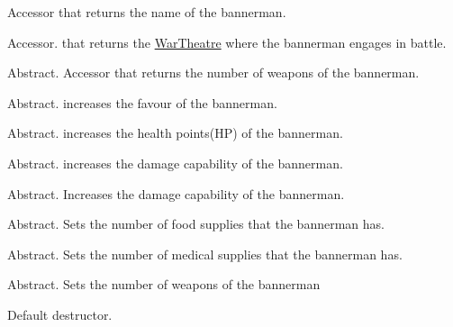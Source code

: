 \begin{DoxyRefList}
%
Accessor that returns the name of the bannerman.  
\item[Member \mbox{\hyperlink{class_bannerman_a60ee23b181d1c0ae692fe86c028c65a2}{Bannerman\+::get\+War\+Zone}} ()]\label{todo__todo000020}%
%
Accessor. that returns the \mbox{\hyperlink{class_war_theatre}{War\+Theatre}} where the bannerman engages in battle.  
\item[Member \mbox{\hyperlink{class_bannerman_aa5c91236353408518cb3c4c28d47f4fe}{Bannerman\+::get\+Weapons}} ()=0]\label{todo__todo000021}%
%
Abstract. Accessor that returns the number of weapons of the bannerman.  
\item[Member \mbox{\hyperlink{class_bannerman_a87872034f7a5171f084d421eba81b6a5}{Bannerman\+::increase\+Favour}} ()=0]\label{todo__todo000005}%
%
Abstract. increases the favour of the bannerman.  
\item[Member \mbox{\hyperlink{class_bannerman_a414eed3d8e51c65cab88992092dc2e3f}{Bannerman\+::increase\+HP}} (int boost)=0]\label{todo__todo000009}%
%
Abstract. increases the health points(\+HP) of the bannerman.  
\item[Member \mbox{\hyperlink{class_bannerman_a1abcef28173e5b38ece6306be6b02148}{Bannerman\+::increase\+Power}} (int boost)=0]\label{todo__todo000012}%
%
Abstract. increases the damage capability of the bannerman.  
\item[Member \mbox{\hyperlink{class_bannerman_a794eacd3816c899b12fde0ab1b672485}{Bannerman\+::receive\+Damage}} (int boost)=0]\label{todo__todo000016}%
%
Abstract. Increases the damage capability of the bannerman.  
\item[Member \mbox{\hyperlink{class_bannerman_ae820506437fc6806b77904186c7b3d10}{Bannerman\+::set\+Food}} (int num\+Food)=0]\label{todo__todo000025}%
%
Abstract. Sets the number of food supplies that the bannerman has.  
\item[Member \mbox{\hyperlink{class_bannerman_a288a8a59848ff68be805b540cbe601ea}{Bannerman\+::set\+Medical}} (int num\+Medical)=0]\label{todo__todo000026}%
%
Abstract. Sets the number of medical supplies that the bannerman has.  
\item[Member \mbox{\hyperlink{class_bannerman_abd90e4eaef5547c02da8f4f49186eb52}{Bannerman\+::set\+Weapons}} (int num\+Weapons)=0]\label{todo__todo000024}%
%
Abstract. Sets the number of weapons of the bannerman  
\item[Member \mbox{\hyperlink{class_bannerman_add811865a500b84e9baa7fff28230115}{Bannerman\+::$\sim$\+Bannerman}} ()]\label{todo__todo000027}%
%
Default destructor. 
\end{DoxyRefList}